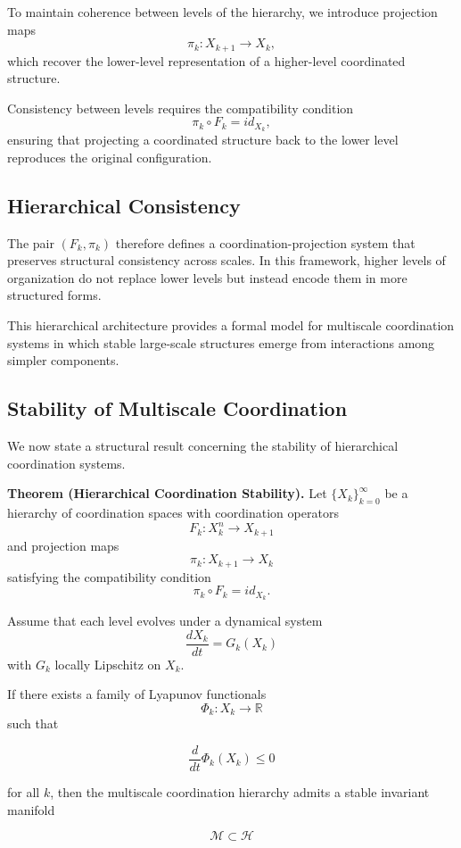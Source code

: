 \documentclass[12pt]{article}
\begin{document}
To maintain coherence between levels of the hierarchy, we introduce projection maps
\[
\pi_k : X_{k+1} \rightarrow X_k ,
\]
which recover the lower-level representation of a higher-level coordinated structure.

Consistency between levels requires the compatibility condition
\[
\pi_k \circ F_k = id_{X_k},
\]
ensuring that projecting a coordinated structure back to the lower level reproduces the original configuration.

\subsection{Hierarchical Consistency}

The pair $(F_k, \pi_k)$ therefore defines a coordination-projection system that preserves structural consistency across scales. In this framework, higher levels of organization do not replace lower levels but instead encode them in more structured forms.

This hierarchical architecture provides a formal model for multiscale coordination systems in which stable large-scale structures emerge from interactions among simpler components.

\subsection{Stability of Multiscale Coordination}

We now state a structural result concerning the stability of hierarchical coordination systems.

\textbf{Theorem (Hierarchical Coordination Stability).}
Let $\{X_k\}_{k=0}^{\infty}$ be a hierarchy of coordination spaces with coordination operators
\[
F_k : X_k^n \rightarrow X_{k+1}
\]
and projection maps
\[
\pi_k : X_{k+1} \rightarrow X_k
\]
satisfying the compatibility condition
\[
\pi_k \circ F_k = id_{X_k}.
\]

Assume that each level evolves under a dynamical system
\[
\frac{dX_k}{dt} = G_k(X_k)
\]
with $G_k$ locally Lipschitz on $X_k$.

If there exists a family of Lyapunov functionals
\[
\Phi_k : X_k \rightarrow \mathbb{R}
\]
such that

\[
\frac{d}{dt}\Phi_k(X_k) \le 0
\]

for all $k$, then the multiscale coordination hierarchy admits a stable invariant manifold

\[
\mathcal{M} \subset \mathcal{H}
\]
\end{document}
